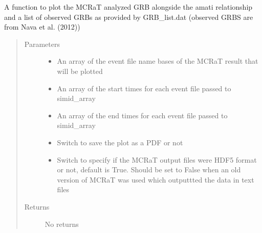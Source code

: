 \documentclass[letterpaper,10pt,english]{sphinxmanual}
\begin{document}
\begin{fulllineitems}
\label{\detokenize{read_process_files:read_process_files.get_amati_rel}}
A function to plot the MCRaT analyzed GRB alongside the amati relationship and a list of observed GRBs as
provided by GRB\_list.dat (observed GRBS are from Nava et al. (2012))
\begin{quote}\begin{description}
\item[{Parameters}] \leavevmode\begin{itemize}
\item {} 
 \textendash{} An array of the event file name bases of the MCRaT result that will be plotted

\item {} 
 \textendash{} An array of the start times for each event file passed to simid\_array

\item {} 
 \textendash{} An array of the end times for each event file passed to simid\_array

\item {} 
 \textendash{} Switch to save the plot as a PDF or not

\item {} 
 \textendash{} Switch to specify if the MCRaT output files were HDF5 format or not, default is True. Should be set to
False when an old version of MCRaT was used which outputtted the data in text files

\end{itemize}

\item[{Returns}] \leavevmode
No returns

\end{description}\end{quote}

\end{fulllineitems}

\end{document}
